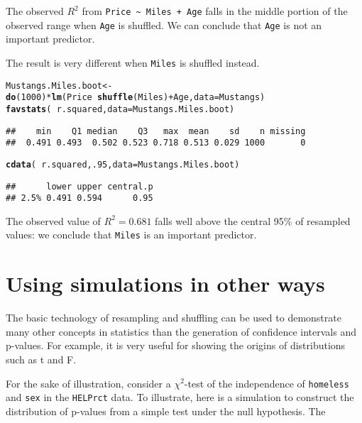 \documentclass[11pt]{article}\usepackage[]{graphicx}\usepackage[]{color}
\makeatletter
\newcommand{\hlnum}[1]{\textcolor[rgb]{0.686,0.059,0.569}{#1}}%
\newcommand{\hlopt}[1]{\textcolor[rgb]{0,0,0}{#1}}%
\newcommand{\hlstd}[1]{\textcolor[rgb]{0.345,0.345,0.345}{#1}}%
\newcommand{\hlkwb}[1]{\textcolor[rgb]{0.69,0.353,0.396}{#1}}%
\newcommand{\hlkwc}[1]{\textcolor[rgb]{0.333,0.667,0.333}{#1}}%
\newcommand{\hlkwd}[1]{\textcolor[rgb]{0.737,0.353,0.396}{\textbf{#1}}}%
\newenvironment{kframe}{%
 \def\at@end@of@kframe{}%
 \ifinner\ifhmode%
  \def\at@end@of@kframe{\end{minipage}}%
  \begin{minipage}{\columnwidth}%
 \fi\fi%
 \def\FrameCommand##1{\hskip\@totalleftmargin \hskip-\fboxsep
 \colorbox{shadecolor}{##1}\hskip-\fboxsep
     \hskip-\linewidth \hskip-\@totalleftmargin \hskip\columnwidth}%
 \MakeFramed {\advance\hsize-\width
   \@totalleftmargin\z@ \linewidth\hsize
   \@setminipage}}%
 {\par\unskip\endMakeFramed%
 \at@end@of@kframe}
\newenvironment{knitrout}{}{} %
\makeatother
\begin{document}
The observed $R^2$ from \verb-Price ~ Miles + Age- falls in the middle portion of the 
observed range when \texttt{Age} is shuffled.  We can conclude that \texttt{Age} is not an important predictor.

The result is very different when \texttt{Miles} is shuffled instead.
\begin{knitrout}
\color{fgcolor}\begin{kframe}
\begin{alltt}
\hlstd{Mustangs.Miles.boot} \hlkwb{<-} \hlkwd{do}\hlstd{(}\hlnum{1000}\hlstd{)} \hlopt{*} \hlkwd{lm}\hlstd{(Price} \hlopt{~} \hlkwd{shuffle}\hlstd{(Miles)} \hlopt{+} \hlstd{Age,} \hlkwc{data} \hlstd{= Mustangs)}
\hlkwd{favstats}\hlstd{(}\hlopt{~} \hlstd{r.squared,} \hlkwc{data} \hlstd{= Mustangs.Miles.boot)}
\end{alltt}
\begin{verbatim}
##    min    Q1 median    Q3   max  mean    sd    n missing
##  0.491 0.493  0.502 0.523 0.718 0.513 0.029 1000       0
\end{verbatim}
\begin{alltt}
\hlkwd{cdata}\hlstd{(}\hlopt{~} \hlstd{r.squared,} \hlnum{.95}\hlstd{,} \hlkwc{data} \hlstd{= Mustangs.Miles.boot)}
\end{alltt}
\begin{verbatim}
##      lower upper central.p
## 2.5% 0.491 0.594      0.95
\end{verbatim}
\end{kframe}
\end{knitrout}
The observed value of $R^2 = 0.681$ falls well above the central 95\% of resampled values: 
we conclude that  \texttt{Miles} is an important predictor.

\section{Using simulations in other ways}

The basic technology of resampling and shuffling can be used to
demonstrate many other concepts in statistics than the generation of
confidence intervals and p-values.  For example, it is very useful for
showing the origins of distributions such as t and F.  

For the sake of illustration, consider a $\chi^2$-test of the independence of \texttt{homeless} and \texttt{sex} in the \texttt{HELPrct} data.
To illustrate, here is a simulation to construct the distribution of p-values from a simple test under the null hypothesis.  The 
\end{document}

